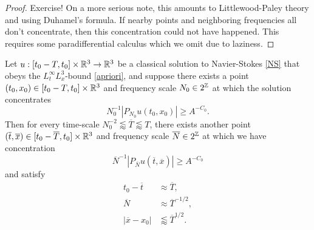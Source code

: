 \begin{proof}
	Exercise! On a more serious note, this amounts to Littlewood-Paley theory and using Duhamel's formula. If nearby points and neighboring frequencies all don't concentrate, then this concentration could not have happened. This requires some paradifferential calculus which we omit due to laziness. 
\end{proof}


\begin{proposition}\label{prop:back}
	Let $u : [t_0 - T, t_0] \times \mathbb R^3 \to \mathbb R^3$ be a classical solution to Navier-Stokes \eqref{NS} that obeys the $L^\infty_t L^3_x$-bound \eqref{apriori}, and suppose there exists a point $(t_0, x_0) \in [t_0 - T, t_0] \times \mathbb R^3$ and frequency scale $N_0 \in 2^\mathbb Z$ at which the solution concentrates
		\[
			N_0^{-1} |P_{N_0} u(t_0, x_0)| \geq A^{-C_0}.
		\]
	Then for every time-scale $N_0^{-2} \lessapprox \overline T \lessapprox T$, there exists another point $(\overline t, \overline x) \in [t_0 - \overline T, t_0] \times \mathbb R^3$ and frequency scale $\overline N \in 2^\mathbb Z$ at which we have concentration
		\[
			{\overline N}^{-1} |P_{\overline N} u(\overline t, \overline x)| \geq A^{-C_0}
		\]
	and satisfy
		\begin{align*}
			t_0 - \overline t
				&\approx \overline T,\\
			\overline N
				&\approx {\overline T}^{-1/2},\\
			|\overline x - x_0|
				&\lessapprox {\overline T}^{1/2}.
		\end{align*}
		
\end{proposition}


